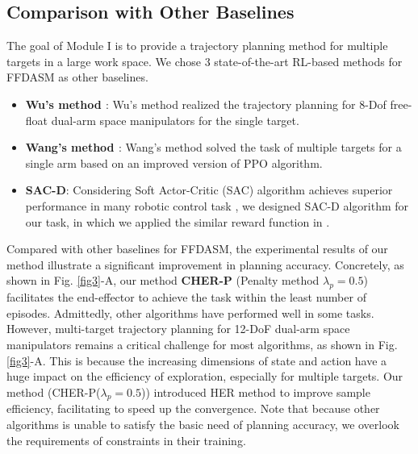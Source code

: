 \documentclass{article}
\begin{document}
\subsection{Comparison with Other Baselines}

The goal of Module I is to provide a trajectory planning method for multiple targets in a large work space. We chose 3 state-of-the-art RL-based methods for FFDASM as other baselines. 
\begin{itemize}
    \item \textbf{Wu's method \cite{2020Reinforcement}}: Wu's method realized the trajectory planning for 8-Dof free-float dual-arm space manipulators for the single target.
    \item \textbf{Wang's method \cite{Wang20221multi}}: Wang's method solved the task of multiple targets for a single arm based on an improved version of PPO algorithm.
    \item \textbf{SAC-D}: Considering Soft Actor-Critic (SAC) algorithm achieves superior performance in many robotic control task \cite{haarnoja2018soft}, we designed SAC-D algorithm for our task, in which we applied the similar reward function in \cite{Wang20221multi}.
\end{itemize}
Compared with other baselines for FFDASM, the experimental results of our method illustrate a significant improvement in planning accuracy. Concretely, as shown in Fig. \ref{fig3}-A, our method \textbf{CHER-P} (Penalty method $\lambda_p =0.5$) facilitates the end-effector to achieve the task within the least number of episodes. Admittedly, other algorithms have performed well in some tasks. However, multi-target trajectory planning for 12-DoF dual-arm space manipulators remains a critical challenge for most algorithms, as shown in Fig. \ref{fig3}-A. This is because the increasing dimensions of state and action have a huge impact on the efficiency of exploration, especially for multiple targets. Our method (CHER-P($\lambda_p =0.5$)) introduced HER method to improve sample efficiency, facilitating to speed up the convergence. Note that because other algorithms is unable to satisfy the basic need of planning accuracy, we overlook the requirements of constraints in their training. 
\end{document}
